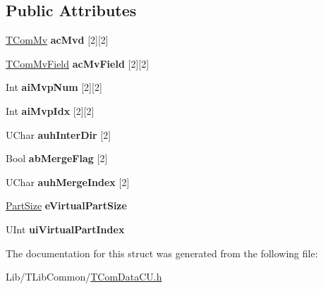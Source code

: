 \subsection*{Public Attributes}
\begin{DoxyCompactItemize}
\item 
\mbox{\label{struct___d_b_b_p_tmp_data_adf1909f41320942579635a720bbb249b}} 
\hyperlink{class_t_com_mv}{T\+Com\+Mv} {\bfseries ac\+Mvd} \mbox{[}2\mbox{]}\mbox{[}2\mbox{]}
\item 
\mbox{\label{struct___d_b_b_p_tmp_data_a224d16d2a1fc07bfeec2800671fcda62}} 
\hyperlink{class_t_com_mv_field}{T\+Com\+Mv\+Field} {\bfseries ac\+Mv\+Field} \mbox{[}2\mbox{]}\mbox{[}2\mbox{]}
\item 
\mbox{\label{struct___d_b_b_p_tmp_data_a7609ef089dc6f6343eb6daddb2516cdd}} 
Int {\bfseries ai\+Mvp\+Num} \mbox{[}2\mbox{]}\mbox{[}2\mbox{]}
\item 
\mbox{\label{struct___d_b_b_p_tmp_data_a97267ec9c4852a8270b46278ff5c736c}} 
Int {\bfseries ai\+Mvp\+Idx} \mbox{[}2\mbox{]}\mbox{[}2\mbox{]}
\item 
\mbox{\label{struct___d_b_b_p_tmp_data_a11982df8f479316b70ed5ac7ea380302}} 
U\+Char {\bfseries auh\+Inter\+Dir} \mbox{[}2\mbox{]}
\item 
\mbox{\label{struct___d_b_b_p_tmp_data_a93965876364474b2fbcbb19888137389}} 
Bool {\bfseries ab\+Merge\+Flag} \mbox{[}2\mbox{]}
\item 
\mbox{\label{struct___d_b_b_p_tmp_data_a79ce04f58cf353eba1d6d3f1cb9323bd}} 
U\+Char {\bfseries auh\+Merge\+Index} \mbox{[}2\mbox{]}
\item 
\mbox{\label{struct___d_b_b_p_tmp_data_aeb6ad368715d8cb9f7931f98ab27764f}} 
\hyperlink{_type_def_8h_a0093b7809f3cfae06fda9d67441267bd}{Part\+Size} {\bfseries e\+Virtual\+Part\+Size}
\item 
\mbox{\label{struct___d_b_b_p_tmp_data_a2c97c0cf1941fc1b90b86e46258753bf}} 
U\+Int {\bfseries ui\+Virtual\+Part\+Index}
\end{DoxyCompactItemize}


The documentation for this struct was generated from the following file\+:\begin{DoxyCompactItemize}
\item 
Lib/\+T\+Lib\+Common/\hyperlink{_t_com_data_c_u_8h}{T\+Com\+Data\+C\+U.\+h}\end{DoxyCompactItemize}
